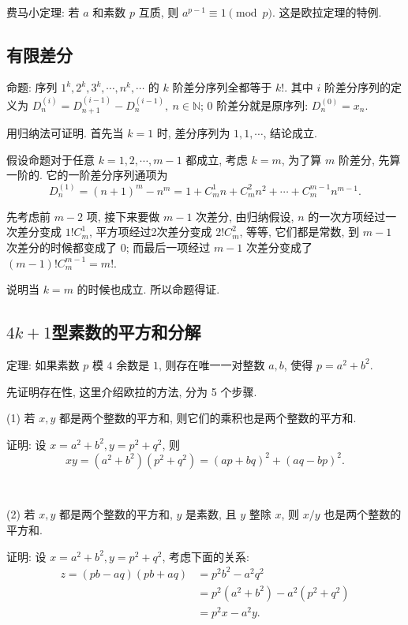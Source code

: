 ~

\noindent 费马小定理: 若 $ a $ 和素数 $ p $ 互质, 则 $ a^{p-1} \equiv 1 \pmod{p} $. 这是欧拉定理的特例.

\subsection{有限差分}

命题: 序列 $ 1^k, 2^k, 3^k, \cdots, n^k, \cdots $ 的 $ k $ 阶差分序列全都等于 $ k! $. 其中 $ i $ 阶差分序列的定义为 $ D^{(i)}_n = D^{(i-1)}_{n+1} - D^{(i-1)}_n, \ n\in\mathbb{N} $; $ 0 $ 阶差分就是原序列: $ D^{(0)}_n = x_n $.

用归纳法可证明. 首先当 $ k = 1 $ 时, 差分序列为 $ 1, 1, \cdots $, 结论成立.

假设命题对于任意 $ k = 1, 2, \cdots, m - 1 $ 都成立, 考虑 $ k = m $, 为了算 $m$ 阶差分, 先算一阶的. 它的一阶差分序列通项为 
$$ D^{(1)}_n = (n+1)^{m} - n^m = 1 + C_m^1n + C_m^2n^2+\cdots+C_m^{m-1}n^{m-1} .$$ 

先考虑前 $ m - 2 $ 项, 接下来要做 $ m - 1 $ 次差分, 由归纳假设, $ n $ 的一次方项经过一次差分变成 $ 1!C_m^1 $, 平方项经过2次差分变成 $ 2!C_m^2 $, 等等, 它们都是常数, 到 $ m - 1 $ 次差分的时候都变成了 $ 0 $; 而最后一项经过 $ m - 1 $ 次差分变成了 $ (m-1)!C_m^{m-1} = m! $. 

说明当 $ k = m $ 的时候也成立. 所以命题得证.

\subsection{$4k+1$型素数的平方和分解}

\noindent 定理: 如果素数 $ p $ 模 $ 4 $ 余数是 $ 1 $, 则存在唯一一对整数 $a,b$, 使得 $ p = a^2 + b^2 $.

先证明存在性, 这里介绍欧拉的方法, 分为 5 个步骤.

\noindent (1) 若 $ x,y $ 都是两个整数的平方和, 则它们的乘积也是两个整数的平方和.

证明: 设 $ x = a^2+b^2, y = p^2+q^2 $, 则 \[ xy = (a^2+b^2)(p^2+q^2)=(ap+bq)^2+(aq-bp)^2 .\]

~

\noindent (2) 若 $ x,y $ 都是两个整数的平方和, $ y $ 是素数, 且 $ y $ 整除 $ x $, 则 $ x/y $ 也是两个整数的平方和.

证明: 设 $ x = a^2+b^2, y = p^2+q^2 $, 考虑下面的关系:
\begin{align*} 
z = (pb-aq)(pb+aq) & = p^2b^2-a^2q^2 \\
	& = p^2(a^2+b^2)-a^2(p^2+q^2)\\
	& =p^2x-a^2y.
\end{align*}

